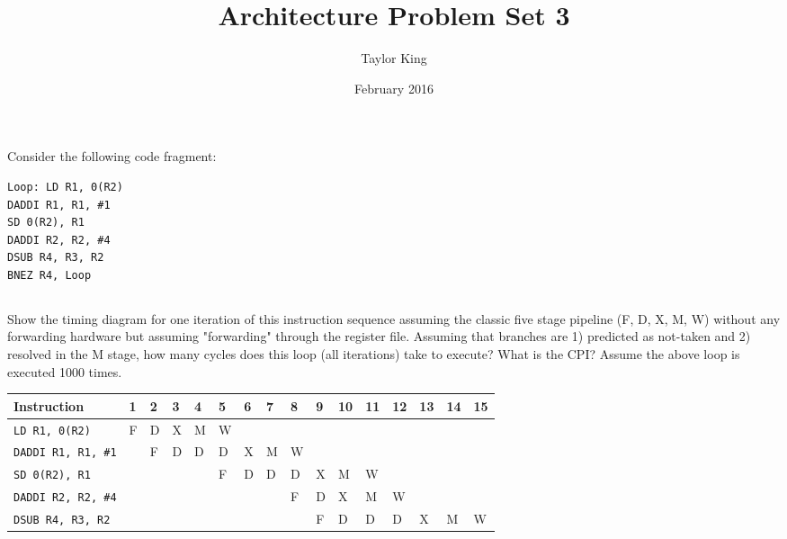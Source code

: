 \documentclass{article}
\title{Architecture Problem Set 3}
\author{Taylor King }
\date{February 2016}
\begin{document}
\maketitle
\section{}
Consider the following code fragment: 

\begin{lstlisting}
Loop: LD R1, 0(R2)
DADDI R1, R1, #1
SD 0(R2), R1
DADDI R2, R2, #4 
DSUB R4, R3, R2
BNEZ R4, Loop
\end{lstlisting}
\begin{adjustwidth}{2.5em}{0pt}
\subsection{}
Show the timing diagram for one iteration of this instruction sequence assuming the classic five stage pipeline (F, D, X, M, W) without any forwarding hardware but assuming "forwarding" through the register file. Assuming that branches are 1) predicted as not-taken and 2) resolved in the M stage, how many cycles does this loop (all iterations) take to execute?  What is the CPI? Assume the above loop is executed 1000 times.

\vspace{5mm}
\begin{tabular}{|p{3cm}|p{.2cm}|p{.2cm}|p{.2cm}|p{.2cm}|p{.2cm}|p{.2cm}|p{.2cm}|p{.2cm}|p{.2cm}|p{.2cm}|p{.2cm}|p{.2cm}|p{.2cm}|p{.2cm}|p{.2cm}|}
\hline
\textbf{Instruction} & \textbf{1} & \textbf{2} & \textbf{3} & \textbf{4} & \textbf{5} & \textbf{6} & \textbf{7} & \textbf{8} & \textbf{9} & \textbf{10} & \textbf{11} & \textbf{12} & \textbf{13} & \textbf{14} & \textbf{15}\\
\hline
\texttt{LD R1, 0(R2)} & F & D & X & M & W & & & & & & & & & &   \\
\texttt{DADDI R1, R1, \#1}&  & F & D & D & D & X& M& W& & & & & & &  \\
\texttt{SD 0(R2), R1} & &  &  & &  F& D& D& D& X& M& W& & & &  \\
\texttt{DADDI R2, R2, \#4} & & & & & & & & F& D& X& M& W& & &\\
\texttt{DSUB R4, R3, R2} & & & & & & & & & F& D& D& D& X& M& W \\
\hline
\end{tabular}


\end{adjustwidth}
\end{document}
